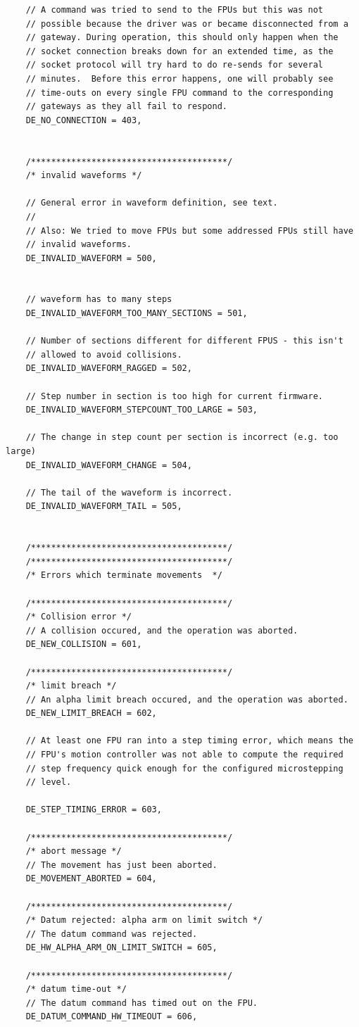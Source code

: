 \documentclass[11pt,a4paper]{scrartcl}
\begin{document}
\begin{verbatim}
    // A command was tried to send to the FPUs but this was not
    // possible because the driver was or became disconnected from a
    // gateway. During operation, this should only happen when the
    // socket connection breaks down for an extended time, as the
    // socket protocol will try hard to do re-sends for several
    // minutes.  Before this error happens, one will probably see
    // time-outs on every single FPU command to the corresponding
    // gateways as they all fail to respond.
    DE_NO_CONNECTION = 403,


    /***************************************/
    /* invalid waveforms */

    // General error in waveform definition, see text.
    //
    // Also: We tried to move FPUs but some addressed FPUs still have
    // invalid waveforms.
    DE_INVALID_WAVEFORM = 500,


    // waveform has to many steps
    DE_INVALID_WAVEFORM_TOO_MANY_SECTIONS = 501,

    // Number of sections different for different FPUS - this isn't
    // allowed to avoid collisions.
    DE_INVALID_WAVEFORM_RAGGED = 502,

    // Step number in section is too high for current firmware.
    DE_INVALID_WAVEFORM_STEPCOUNT_TOO_LARGE = 503,

    // The change in step count per section is incorrect (e.g. too large)
    DE_INVALID_WAVEFORM_CHANGE = 504,

    // The tail of the waveform is incorrect.
    DE_INVALID_WAVEFORM_TAIL = 505,


    /***************************************/
    /***************************************/
    /* Errors which terminate movements  */

    /***************************************/
    /* Collision error */
    // A collision occured, and the operation was aborted.
    DE_NEW_COLLISION = 601,

    /***************************************/
    /* limit breach */
    // An alpha limit breach occured, and the operation was aborted.
    DE_NEW_LIMIT_BREACH = 602,

    // At least one FPU ran into a step timing error, which means the
    // FPU's motion controller was not able to compute the required
    // step frequency quick enough for the configured microstepping
    // level.

    DE_STEP_TIMING_ERROR = 603,

    /***************************************/
    /* abort message */
    // The movement has just been aborted.
    DE_MOVEMENT_ABORTED = 604,

    /***************************************/
    /* Datum rejected: alpha arm on limit switch */
    // The datum command was rejected.
    DE_HW_ALPHA_ARM_ON_LIMIT_SWITCH = 605,

    /***************************************/
    /* datum time-out */
    // The datum command has timed out on the FPU.
    DE_DATUM_COMMAND_HW_TIMEOUT = 606,
\end{verbatim}
\end{document}
